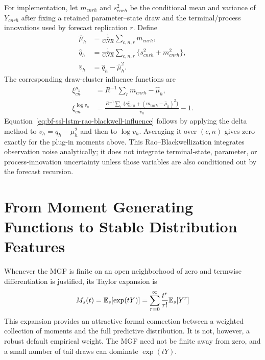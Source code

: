 For implementation, let $m_{cnrh}$ and $s^2_{cnrh}$ be the conditional mean
and variance of $Y_{cnrh}$ after fixing a retained parameter--state draw and
the terminal/process innovations used by forecast replication $r$.  Define
\begin{align}
  \widehat\mu_h
    &=\frac{1}{CNR}\sum_{c,n,r}m_{cnrh},\\
  \widehat q_h
    &=\frac{1}{CNR}\sum_{c,n,r}\{s^2_{cnrh}+m_{cnrh}^2\},\\
  \widehat v_h
    &=\widehat q_h-\widehat\mu_h^2.
  \label{eq:bf-ssl-lstm-rao-blackwell-estimator}
\end{align}
The corresponding draw-cluster influence functions are
\begin{align}
  \xi^{\mu_h}_{cn}
    &=R^{-1}\sum_r m_{cnrh}-\widehat\mu_h,\\
  \xi^{\log v_h}_{cn}
    &=\frac{R^{-1}\sum_r\{s^2_{cnrh}+
                   (m_{cnrh}-\widehat\mu_h)^2\}}{\widehat v_h}-1.
  \label{eq:bf-ssl-lstm-rao-blackwell-influence}
\end{align}
Equation~\eqref{eq:bf-ssl-lstm-rao-blackwell-influence} follows by applying
the delta method to $v_h=q_h-\mu_h^2$ and then to $\log v_h$.  Averaging it
over $(c,n)$ gives zero exactly for the plug-in moments above.  This
Rao--Blackwellization integrates observation noise analytically; it does not
integrate terminal-state, parameter, or process-innovation uncertainty unless
those variables are also conditioned out by the forecast recursion.

\section[MGFs and Stable Distribution Features]
{From Moment Generating Functions to Stable Distribution Features}
\label{sec:bf-ssl-lstm-mgf-cf}

Whenever the MGF is finite on an open neighborhood of zero and termwise
differentiation is justified, its Taylor expansion is
\begin{equation}
  M_s(t)=\mathbb{E}_s[\exp(tY)]
  =\sum_{r=0}^{\infty}\frac{t^r}{r!}\mathbb{E}_s[Y^r]
  \label{eq:bf-ssl-lstm-mgf}
\end{equation}
This expansion provides an attractive formal connection between a weighted
collection of moments and the full predictive distribution.  It is not,
however, a robust default empirical weight.  The MGF need not be finite away
from zero, and a small number of tail draws can dominate $\exp(tY)$.

